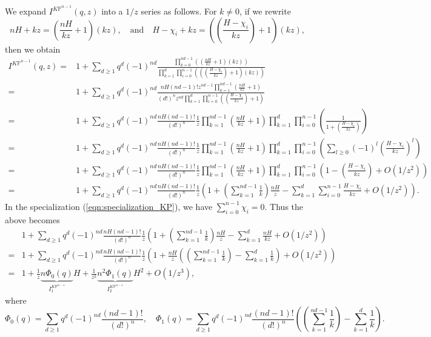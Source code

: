 \documentclass[12pt]{amsart}
\numberwithin{equation}{section}
\newcommand{\KP}{K\mathbb{P}}
\begin{document}
We expand $I^{K\mathbb{P}^{n-1}}(q,z)$ into a $1/z$ series as follows. For $k\neq 0$, if we rewrite 
\begin{equation*}
nH+kz=\left(\frac{nH}{kz}+1\right)(kz), \quad \text{and} \quad H-\chi_i+kz=\left(\left(\frac{H-\chi_i}{kz}\right)+1\right)(kz),
\end{equation*}
then we obtain
\begin{equation}\label{eqn:I_func_analysis_for_mirrorthm}
\begin{split}
I^{K\mathbb{P}^{n-1}}(q,z)
=&1+\sum_{d\geq{1}}q^d(-1)^{nd}\frac{\prod_{k=0}^{nd-1}(\left(\frac{nH}{kz}+1\right)(kz))}{\prod_{k=1}^d\prod_{i=0}^{n-1}(\left(\left(\frac{H-\chi_i}{kz}\right)+1\right)(kz))}\\
=&1+\sum_{d\geq 1}q^d(-1)^{nd}\frac{nH(nd-1)!z^{nd-1}\prod_{k=1}^{nd-1}\left(\frac{nH}{kz}+1\right)}{(d!)^nz^{nd}\prod_{k=1}^d\prod_{i=0}^{n-1}\left(\left(\frac{H-\chi_i}{kz}\right)+1\right)}\\
=&1+\sum_{d\geq 1}q^d(-1)^{nd}\frac{nH(nd-1)!}{(d!)^n}\frac{1}{z}\prod_{k=1}^{nd-1}\left(\frac{nH}{kz}+1\right)\prod_{k=1}^d\prod_{i=0}^{n-1}\left(\frac{1}{1+\left(\frac{H-\chi_i}{kz}\right)} \right)\\
=&1+\sum_{d\geq 1}q^d(-1)^{nd}\frac{nH(nd-1)!}{(d!)^n}\frac{1}{z}\prod_{k=1}^{nd-1}\left(\frac{nH}{kz}+1\right)\prod_{k=1}^d\prod_{i=0}^{n-1}\left(\sum_{l\geq 0}(-1)^l\left(\frac{H-\chi_i}{kz}\right)^l\right)\\
=&1+\sum_{d\geq 1}q^d(-1)^{nd}\frac{nH(nd-1)!}{(d!)^n}\frac{1}{z}\prod_{k=1}^{nd-1}\left(\frac{nH}{kz}+1\right)\prod_{k=1}^d\prod_{i=0}^{n-1}\left(1-\left(\frac{H-\chi_i}{kz}\right)+O(1/z^2)\right)\\
=&1+\sum_{d\geq 1}q^d(-1)^{nd}\frac{nH(nd-1)!}{(d!)^n}\frac{1}{z}\left(1+\left( \sum_{k=1}^{nd-1}\frac{1}{k}\right)\frac{nH}{z}-\sum_{k=1}^d\sum_{i=0}^{n-1}\frac{H-\chi_i}{kz}+O(1/z^2)\right).
\end{split}
\end{equation}
In the specialization (\ref{eqn:specialization_KP}), we have $\sum_{i=0}^{n-1}\chi_i=0$. Thus the above becomes
\begin{equation*}
\begin{split}
&1+\sum_{d\geq 1}q^d(-1)^{nd}\frac{nH(nd-1)!}{(d!)^n}\frac{1}{z}\left(1+\left(\sum_{k=1}^{nd-1}\frac{1}{k}\right)\frac{nH}{z}-\sum_{k=1}^d\frac{nH}{kz}+O(1/z^2)\right)\\
=&1+\sum_{d\geq 1}q^d(-1)^{nd}\frac{nH(nd-1)!}{(d!)^n}\frac{1}{z}\left(1+\frac{nH}{z}\left(\left(\sum_{k=1}^{nd-1}\frac{1}{k}\right)-\sum_{k=1}^d\frac{1}{k}\right)+O(1/z^2)\right)\\
=&1+\frac{1}{z}\underbrace{n\Phi_0(q)}_{I^{\KP^{n-1}}_1}H+\frac{1}{z^2}\underbrace{n^2\Phi_1(q)}_{I^{\KP^{n-1}}_2}H^2+O(1/z^3),
\end{split}
\end{equation*}
where
\begin{equation*}
\Phi_0(q)=\sum_{d\geq 1}q^d(-1)^{nd}\frac{(nd-1)!}{(d!)^n}, \quad \Phi_1(q)=\sum_{d\geq 1}q^d(-1)^{nd}\frac{(nd-1)!}{(d!)^n}\left(\left(\sum_{k=1}^{nd-1}\frac{1}{k}\right)-\sum_{k=1}^d\frac{1}{k}\right).    
\end{equation*}
\end{document}
